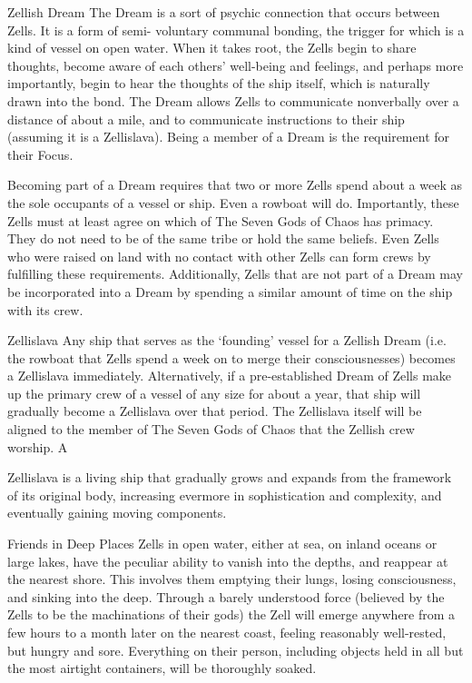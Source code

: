 \documentclass[oneside,11pt,english]{book}
\begin{document}
Zellish Dream 
The Dream is a sort of psychic connection that occurs between Zells. It is a form of semi-
voluntary communal bonding, the trigger for which is a kind of vessel on open water. When it 
takes root, the Zells begin to share thoughts, become aware of each others' well-being and 
feelings, and perhaps more importantly, begin to hear the thoughts of the ship itself, which is 
naturally drawn into the bond. The Dream allows Zells to communicate nonverbally over a 
distance of about a mile, and to communicate instructions to their ship (assuming it is a 
Zellislava). Being a member of a Dream is the requirement for their Focus. 

 

Becoming part of a Dream requires that two or more Zells spend about a week as the sole 
occupants of a vessel or ship. Even a rowboat will do. Importantly, these Zells must at least agree 
on which of The Seven Gods of Chaos has primacy. They do not need to be of the same tribe or 
hold the same beliefs. Even Zells who were raised on land with no contact with other Zells can 
form crews by fulfilling these requirements. Additionally, Zells that are not part of a Dream may 
be incorporated into a Dream by spending a similar amount of time on the ship with its crew. 

 

Zellislava 
Any ship that serves as the ‘founding’ vessel for a Zellish Dream (i.e. the rowboat that Zells 
spend a week on to merge their consciousnesses) becomes a Zellislava immediately. 
Alternatively, if a pre-established Dream of Zells make up the primary crew of a vessel of any 
size for about a year, that ship will gradually become a Zellislava over that period. The Zellislava 
itself will be aligned to the member of The Seven Gods of Chaos that the Zellish crew worship. A 


Zellislava is a living ship that gradually grows and expands from the framework of its original 
body, increasing evermore in sophistication and complexity, and eventually gaining moving 
components. 

 

Friends in Deep Places 
Zells in open water, either at sea, on inland oceans or large lakes, have the peculiar ability to 
vanish into the depths, and reappear at the nearest shore. This involves them emptying their lungs, 
losing consciousness, and sinking into the deep. Through a barely understood force (believed by 
the Zells to be the machinations of their gods) the Zell will emerge anywhere from a few hours to 
a month later on the nearest coast, feeling reasonably well-rested, but hungry and sore. 
Everything on their person, including objects held in all but the most airtight containers, will be 
thoroughly soaked. 
\end{document}
